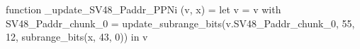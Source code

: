 function _update_SV48_Paddr_PPNi (v, x) = let v = { v with SV48_Paddr_chunk_0 = update_subrange_bits(v.SV48_Paddr_chunk_0, 55, 12, subrange_bits(x, 43, 0)) } in
  v
